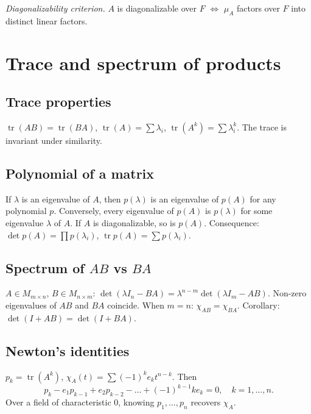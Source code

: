 \textit{Diagonalizability criterion.} $A$ is diagonalizable over $F$ $\iff$ $\mu_A$ factors over $F$ into distinct linear factors.

\medskip

\section{Trace and spectrum of products}
\label{sec:trace-spectrum}

\subsection{Trace properties}
\label{subsec:trace-properties}

$\operatorname{tr}(AB)=\operatorname{tr}(BA)$, $\operatorname{tr}(A)=\sum\lambda_i$, $\operatorname{tr}(A^k)=\sum\lambda_i^k$. The trace is invariant under similarity.

\subsection{Polynomial of a matrix}
\label{subsec:polynomial-eigenvalues}

If $\lambda$ is an eigenvalue of $A$, then $p(\lambda)$ is an eigenvalue of $p(A)$ for any polynomial $p$. Conversely, every eigenvalue of $p(A)$ is $p(\lambda)$ for some eigenvalue $\lambda$ of $A$. If $A$ is diagonalizable, so is $p(A)$. Consequence: $\det p(A)=\prod p(\lambda_i)$, $\operatorname{tr} p(A)=\sum p(\lambda_i)$.

\subsection{Spectrum of $AB$ vs $BA$}
\label{subsec:spectrum-ab-ba}

$A\in M_{m\times n}$, $B\in M_{n\times m}$: $\det(\lambda I_n-BA)=\lambda^{n-m}\det(\lambda I_m-AB)$. Non-zero eigenvalues of $AB$ and $BA$ coincide. When $m=n$: $\chi_{AB}=\chi_{BA}$. Corollary: $\det(I+AB)=\det(I+BA)$.

\subsection{Newton's identities}
\label{subsec:newton-identities}

$p_k=\operatorname{tr}(A^k)$, $\chi_A(t)=\sum(-1)^k e_k t^{n-k}$. Then
$$p_k - e_1 p_{k-1} + e_2 p_{k-2} - \dots + (-1)^{k-1}k e_k = 0,\quad k=1,\dots,n.$$
Over a field of characteristic $0$, knowing $p_1,\dots,p_n$ recovers $\chi_A$.


